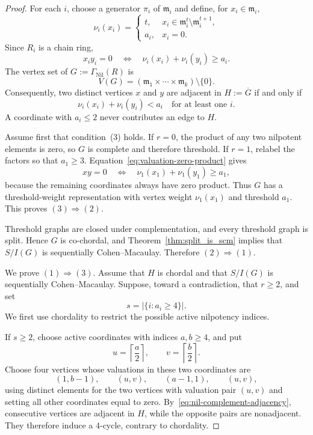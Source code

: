 \documentclass[10pt,a4paper]{amsart}
\begin{document}
\begin{proof}
For each $i$, choose a generator $\pi_i$ of $\mathfrak m_i$ and define, for $x_i\in\mathfrak m_i$,
\[
\nu_i(x_i)=
\begin{cases}
t,&x_i\in\mathfrak m_i^t\setminus\mathfrak m_i^{t+1},\\
a_i,&x_i=0.
\end{cases}
\]
Since $R_i$ is a chain ring,
\begin{equation}\label{eq:valuation-zero-product}
x_iy_i=0
\quad\Longleftrightarrow\quad
\nu_i(x_i)+\nu_i(y_i)\ge a_i.
\end{equation}
The vertex set of $G:=\Gamma_{\operatorname{Nil}}(R)$ is
\[
V(G)=\left(\mathfrak m_1\times\cdots\times\mathfrak m_k\right)\setminus\{0\}.
\]
Consequently, two distinct vertices $x$ and $y$ are adjacent in $H:=\overline G$ if and only if
\begin{equation}\label{eq:nil-complement-adjacency}
\nu_i(x_i)+\nu_i(y_i)<a_i
\quad\text{for at least one }i.
\end{equation}
A coordinate with $a_i\le2$ never contributes an edge to $H$.

Assume first that condition~(3) holds.  If $r=0$, the product of any two nilpotent elements is zero, so $G$ is complete and therefore threshold.  If $r=1$, relabel the factors so that $a_1\ge3$.  Equation~\eqref{eq:valuation-zero-product} gives
\[
xy=0
\quad\Longleftrightarrow\quad
\nu_1(x_1)+\nu_1(y_1)\ge a_1,
\]
because the remaining coordinates always have zero product.  Thus $G$ has a threshold-weight representation with vertex weight $\nu_1(x_1)$ and threshold $a_1$.  This proves $(3)\Rightarrow(2)$.

Threshold graphs are closed under complementation, and every threshold graph is split.  Hence $G$ is co-chordal, and Theorem~\ref{thm:split_is_scm} implies that $S/I(G)$ is sequentially Cohen--Macaulay.  Therefore $(2)\Rightarrow(1)$.

We prove $(1)\Rightarrow(3)$.  Assume that $H$ is chordal and that $S/I(G)$ is sequentially Cohen--Macaulay.  Suppose, toward a contradiction, that $r\ge2$, and set
\[
s=\bigl|\{i:a_i\ge4\}\bigr|.
\]
We first use chordality to restrict the possible active nilpotency indices.

If $s\ge2$, choose active coordinates with indices $a,b\ge4$, and put
\[
u=\left\lceil\frac a2\right\rceil,
\qquad
v=\left\lceil\frac b2\right\rceil.
\]
Choose four vertices whose valuations in these two coordinates are
\[
(1,b-1),\qquad (u,v),\qquad (a-1,1),\qquad (u,v),
\]
using distinct elements for the two vertices with valuation pair $(u,v)$ and setting all other coordinates equal to zero.  By~\eqref{eq:nil-complement-adjacency}, consecutive vertices are adjacent in $H$, while the opposite pairs are nonadjacent.  They therefore induce a $4$-cycle, contrary to chordality.


\end{proof}
\end{document}
